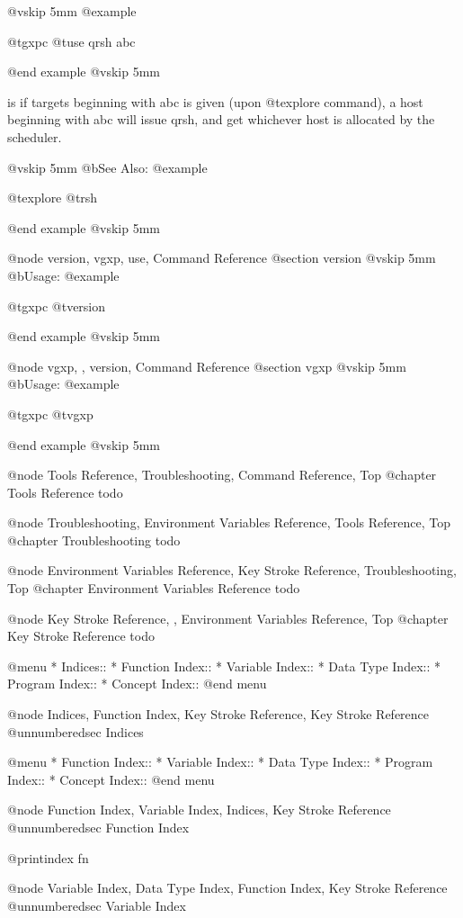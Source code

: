 @vskip 5mm
@example

  @t{gxpc} @t{use} qrsh abc

@end example
@vskip 5mm

is if targets beginning with abc is given (upon @t{explore} command),
a host beginning with abc will issue qrsh, and get whichever host
is allocated by the scheduler.

@vskip 5mm
@b{See Also:}
@example

  @t{explore} @t{rsh}

@end example
@vskip 5mm

@node version, vgxp, use, Command Reference
@section version
@vskip 5mm
@b{Usage:}
@example

  @t{gxpc} @t{version}

@end example
@vskip 5mm

@node vgxp,  , version, Command Reference
@section vgxp
@vskip 5mm
@b{Usage:}
@example

  @t{gxpc} @t{vgxp}

@end example
@vskip 5mm


@node Tools Reference, Troubleshooting, Command Reference, Top
@chapter Tools Reference
todo

@node Troubleshooting, Environment Variables Reference, Tools Reference, Top
@chapter Troubleshooting
todo

@node Environment Variables Reference, Key Stroke Reference, Troubleshooting, Top
@chapter Environment Variables Reference
todo

@node Key Stroke Reference,  , Environment Variables Reference, Top
@chapter Key Stroke Reference
todo

@menu
* Indices::                     
* Function Index::              
* Variable Index::              
* Data Type Index::             
* Program Index::               
* Concept Index::               
@end menu

@node Indices, Function Index, Key Stroke Reference, Key Stroke Reference
@unnumberedsec Indices

@menu
* Function Index::              
* Variable Index::              
* Data Type Index::             
* Program Index::               
* Concept Index::               
@end menu

@node Function Index, Variable Index, Indices, Key Stroke Reference
@unnumberedsec Function Index

@printindex fn

@node Variable Index, Data Type Index, Function Index, Key Stroke Reference
@unnumberedsec Variable Index

